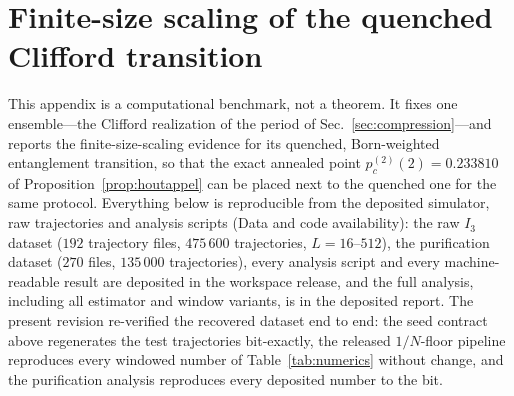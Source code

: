 \documentclass[aps,prx,reprint,superscriptaddress,nobibnotes,longbibliography]{revtex4-2}
\theoremstyle{remark}
\begin{document}
\section{Finite-size scaling of the quenched Clifford transition}
\label{app:numerics}

This appendix is a computational benchmark, not a theorem.  It fixes one ensemble---the Clifford realization of the period of Sec.~\ref{sec:compression}---and reports the finite-size-scaling evidence for its quenched, Born-weighted entanglement transition, so that the exact annealed point $p_c^{(2)}(2)=0.233810$ of Proposition~\ref{prop:houtappel} can be placed next to the quenched one for the same protocol.  Everything below is reproducible from the deposited simulator, raw trajectories and analysis scripts (Data and code availability): the raw $I_3$ dataset ($192$ trajectory files, $475\,600$ trajectories, $L=16$--$512$), the purification dataset ($270$ files, $135\,000$ trajectories), every analysis script and every machine-readable result are deposited in the workspace release, and the full analysis, including all estimator and window variants, is in the deposited report.  The present revision re-verified the recovered dataset end to end: the seed contract above regenerates the test trajectories bit-exactly, the released $1/N$-floor pipeline reproduces every windowed number of Table~\ref{tab:numerics} without change, and the purification analysis reproduces every deposited number to the bit.
\end{document}
